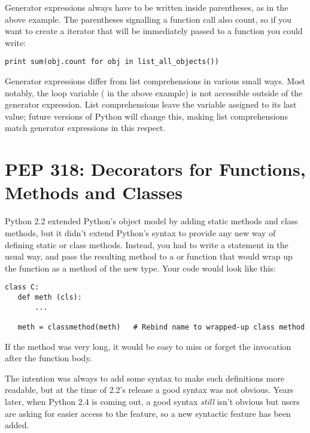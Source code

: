 \documentclass{howto}
\begin{document}
Generator expressions always have to be written inside parentheses, as
in the above example.  The parentheses signalling a function call also
count, so if you want to create a iterator that will be immediately
passed to a function you could write:

\begin{verbatim}
print sum(obj.count for obj in list_all_objects())
\end{verbatim}

Generator expressions differ from list comprehensions in various small
ways.  Most notably, the loop variable ( in the above
example) is not accessible outside of the generator expression.  List
comprehensions leave the variable assigned to its last value; future
versions of Python will change this, making list comprehensions match
generator expressions in this respect.

\begin{seealso}
\end{seealso}

\section{PEP 318: Decorators for Functions, Methods and Classes}

Python 2.2 extended Python's object model by adding static methods and
class methods, but it didn't extend Python's syntax to provide any new
way of defining static or class methods.  Instead, you had to write a
 statement in the usual way, and pass the resulting
method to a  or 
function that would wrap up the function as a method of the new type.
Your code would look like this:

\begin{verbatim}
class C:
   def meth (cls):
       ...
   
   meth = classmethod(meth)   # Rebind name to wrapped-up class method
\end{verbatim}

If the method was very long, it would be easy to miss or forget the
 invocation after the function body.  

The intention was always to add some syntax to make such definitions
more readable, but at the time of 2.2's release a good syntax was not
obvious.  Years later, when Python 2.4 is coming out, a good syntax
\emph{still} isn't obvious but users are asking for easier access to
the feature, so a new syntactic feature has been added.
\end{document}
